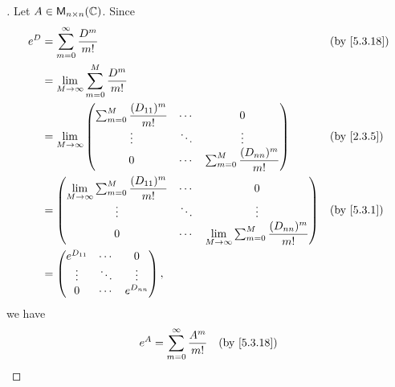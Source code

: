 \begin{proof}[]
  Let \(A \in \ms[n][n][\C]\).
  Since
  \begin{align*}
    e^D & = \sum_{m = 0}^\infty \dfrac{D^m}{m!}                                                                                                                      &  & \by{5.3.18} \\
        & = \Lim_{M \to \infty} \sum_{m = 0}^M \dfrac{D^m}{m!}                                                                                                                        \\
        & = \Lim_{M \to \infty} \begin{pmatrix}
                                  \sum_{m = 0}^M \dfrac{(D_{1 1})^m}{m!} & \cdots & 0                                      \\
                                  \vdots                                 & \ddots & \vdots                                 \\
                                  0                                      & \cdots & \sum_{m = 0}^M \dfrac{(D_{n n})^m}{m!}
                                \end{pmatrix}                                         &  & \by{2.3.5}                                       \\
        & = \begin{pmatrix}
              \Lim_{M \to \infty} \sum_{m = 0}^M \dfrac{(D_{1 1})^m}{m!} & \cdots & 0                                                          \\
              \vdots                                                     & \ddots & \vdots                                                     \\
              0                                                          & \cdots & \Lim_{M \to \infty} \sum_{m = 0}^M \dfrac{(D_{n n})^m}{m!}
            \end{pmatrix} &  & \by{5.3.1}                   \\
        & = \begin{pmatrix}
              e^{D_{1 1}} & \cdots & 0           \\
              \vdots      & \ddots & \vdots      \\
              0           & \cdots & e^{D_{n n}}
            \end{pmatrix},
  \end{align*}
  we have
  \begin{align*}
    e^A & = \sum_{m = 0}^\infty \dfrac{A^m}{m!}                                   &  & \by{5.3.18} \\

\end{align*}
\end{proof}
